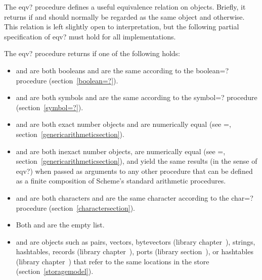 \begin{entry}{%
}

The {\cf eqv?} procedure defines a useful equivalence relation on objects.
Briefly, it returns \schtrue{} if  and  should
normally be regarded as the same object and \schfalse{} otherwise.  This relation is left slightly
open to interpretation, but the following partial specification of
{\cf eqv?} must hold for all implementations.

The {\cf eqv?} procedure returns \schtrue{} if one of the following holds:

\begin{itemize}
\item {} and  are both booleans and are the same
  according to the {\cf boolean=?} procedure (section~\ref{boolean=?}).

\item {} and  are both symbols and are the same
  according to the {\cf symbol=?} procedure (section~\ref{symbol=?}).

\item {} and  are both exact number objects
  and are numerically equal (see {\cf =}, 
  section~\ref{genericarithmeticsection}).

\item {} and  are both inexact
  number objects, are numerically
  equal (see {\cf =}, section~\ref{genericarithmeticsection}), and
  yield the same results (in the sense of {\cf eqv?}) when passed
  as arguments to any other procedure that can be defined
  as a finite composition of Scheme's standard arithmetic
  procedures.

\item {} and  are both characters and are the same
character according to the {\cf char=?} procedure
(section~\ref{charactersection}).

\item Both  and  are the empty list.

\item {} and  are objects such as pairs, vectors, bytevectors
  (library chapter~),
  strings, hashtables, records (library
  chapter~), ports (library
  section~), or hashtables
  (library chapter~) that
  refer to the same locations in the store (section~\ref{storagemodel}).


\end{itemize}
\end{entry}
